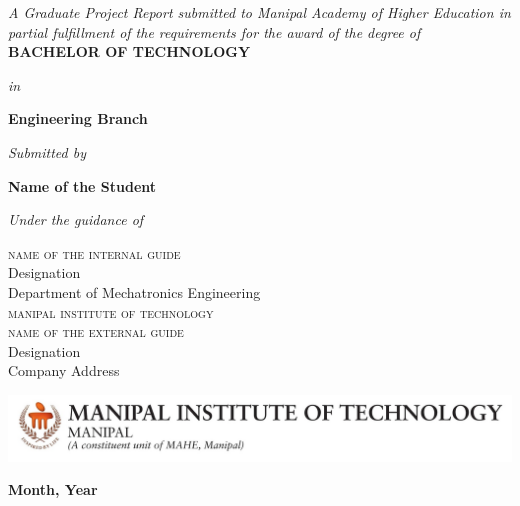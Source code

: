 \begin{titlepage}
    \begin{center}
        \textsc{\textbf{\Large{\thesistitle}}}
        
        \vspace{1.5cm}
        \textit{\large{A Graduate Project Report submitted to Manipal Academy of Higher Education in partial fulfillment of the requirements for the award of the degree of}}\\
        
        \vspace{2.5cm}
        {\textbf{\Large{{BACHELOR OF TECHNOLOGY}}}}
        
        \vspace{0.75cm}
        
        \textit{\large{in}}
        
        \vspace{0.75cm}
        \textbf{\Large{Engineering Branch}}
        
        \vspace{1.25cm}
        \textit{\large{Submitted by}}
        
        \vspace{1cm}
        \textbf{\Large{Name of the Student}}
        
        \vspace{1.5cm}
        \textit{\large{Under the guidance of}}
        
        \vspace{0.5cm}
        \begin{flushleft}
        \begin{multicols}{2}
            \textsc{\large{name of the internal guide}}\\
            \small{Designation\\
            Department of Mechatronics Engineering\\
            }
            \textsc{\large{manipal institute of technology}}\\
            
            \columnbreak
            \textsc{\large{name of the external guide}}\\
            \small{Designation\\
            Company Address\\
            }
        \end{multicols}
        \end{flushleft}
        
        \vspace{1.5cm}
        {\includegraphics[height=0.09\textheight, width=1\textwidth]{figures/mit.jpg}}
        
        \vspace{0.5cm}
        \textbf{Month, Year}
        
    \end{center}
\end{titlepage}